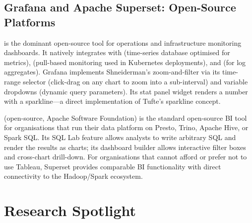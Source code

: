 \subsection{Grafana and Apache Superset: Open-Source Platforms}
\label{subsec:grafana-superset}

 is the dominant open-source tool for operations and
infrastructure monitoring dashboards. It natively integrates with
 (time-series database optimised for metrics),
 (pull-based monitoring used in Kubernetes deployments),
and  (for log aggregates). Grafana implements
Shneiderman's zoom-and-filter via its time-range selector (click-drag
on any chart to zoom into a sub-interval) and variable dropdowns
(dynamic query parameters). Its stat panel widget renders a number with
a sparkline---a direct implementation of Tufte's sparkline concept.

 (open-source, Apache Software Foundation) is
the standard open-source BI tool for organisations that run their data
platform on Presto, Trino, Apache Hive, or Spark SQL. Its SQL Lab
feature allows analysts to write arbitrary SQL and render the results
as charts; its dashboard builder allows interactive filter boxes and
cross-chart drill-down. For organisations that cannot afford or prefer
not to use Tableau, Superset provides comparable BI functionality with
direct connectivity to the Hadoop/Spark ecosystem.

\section{Research Spotlight}
\label{sec:ch9-research}

